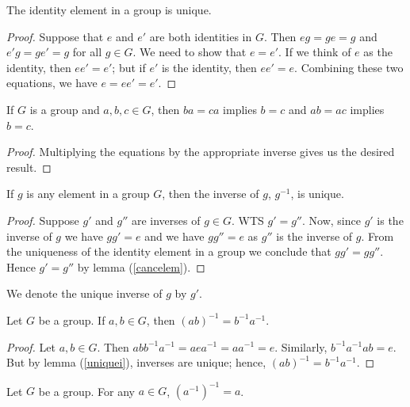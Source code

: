 \begin{lemma}\label{uniquee}
The identity element in a group is unique.
\end{lemma}
\begin{proof}
Suppose that $e$ and $e'$ are both identities in $G$. Then $eg = ge =g$ and $e'g = ge' = g$ for all $g \in G$. We need to show that $e =e'$. If we think of $e$ as the identity, then $ee' = e'$; but if $e'$ is the identity, then $ee' = e$. Combining these two equations, we have $e = ee' = e'$.
\end{proof}

\begin{lem}\label{cancelem}
If $G$ is a group and $a, b, c \in G$, then $ba = ca$ implies $b = c$
and $ab = ac$ implies $b = c$.
\end{lem}
\begin{proof}
Multiplying the equations by the appropriate inverse gives us the desired result.
\end{proof}

\begin{lemma}\label{uniquei}
If $g$ is any element in a group $G$, then the inverse of $g$, $g^{-1}$, is unique.
\end{lemma}
\begin{proof}
Suppose $g'$ and $g''$ are inverses of $g\in G$. WTS $g'=g''$. Now, since $g'$ is the inverse of $g$ we have $gg'=e$ and we have $gg''=e$ as $g''$ is the inverse of $g$. From the uniqueness of the identity element in a group we conclude that $gg'=gg''$. Hence $g'=g''$ by lemma (\ref{cancelem}).
\end{proof}
\begin{remark}
We denote the unique inverse of $g$ by $g'$.
\end{remark}

\begin{proposition}
Let $G$ be a group. If $a, b \in G$, then $(ab)^{-1} = b^{-1}a^{-1}$.
\end{proposition}


\begin{proof}
Let $a, b \in G$. Then $abb^{-1}a^{-1} = aea^{-1} = aa^{-1} = e$. Similarly, $b^{-1}a^{-1}ab = e$. But by lemma (\ref{uniquei}), inverses are unique; hence, $(ab)^{-1} = b^{- 1}a^{-1}$.
\end{proof}


\begin{proposition}
Let $G$ be a group.  For any $a \in G$, $(a^{-1})^{-1} = a$.
\end{proposition}


